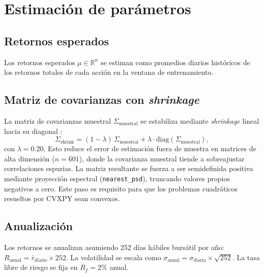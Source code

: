 \section{Estimaci\'on de par\'ametros}

\subsection{Retornos esperados}

Los retornos esperados $\mu \in \mathbb{R}^n$ se estiman como promedios
diarios hist\'oricos de los retornos totales de cada acci\'on en la ventana de
entrenamiento.

\subsection{Matriz de covarianzas con \textit{shrinkage}}

La matriz de covarianzas muestral $\Sigma_{\text{muestral}}$ se estabiliza
mediante \textit{shrinkage} lineal hacia su diagonal
\cite{ledoit2004}:
\begin{equation}
\Sigma_{\text{shrink}} = (1 - \lambda)\,\Sigma_{\text{muestral}}
+ \lambda \cdot \text{diag}(\Sigma_{\text{muestral}}),
\end{equation}
con $\lambda = 0.20$. Esto reduce el error de estimaci\'on fuera de muestra en
matrices de alta dimensi\'on ($n = 601$), donde la covarianza muestral tiende
a sobreajustar correlaciones espurias. La matriz resultante se fuerza a ser
semidefinida positiva mediante proyecci\'on espectral
(\texttt{nearest\_psd}), truncando valores propios negativos a cero. Este paso
es requisito para que los problemas cuadr\'aticos resueltos por CVXPY sean
convexos.

\subsection{Anualizaci\'on}

Los retornos se anualizan asumiendo 252 d\'ias h\'abiles bursátil por a\~no:
$R_{\text{anual}} = \bar{r}_{\text{diario}} \times 252$. La volatilidad se
escala como $\sigma_{\text{anual}} = \sigma_{\text{diaria}} \times
\sqrt{252}$. La tasa libre de riesgo se fija en $R_f = 2\%$ anual.

